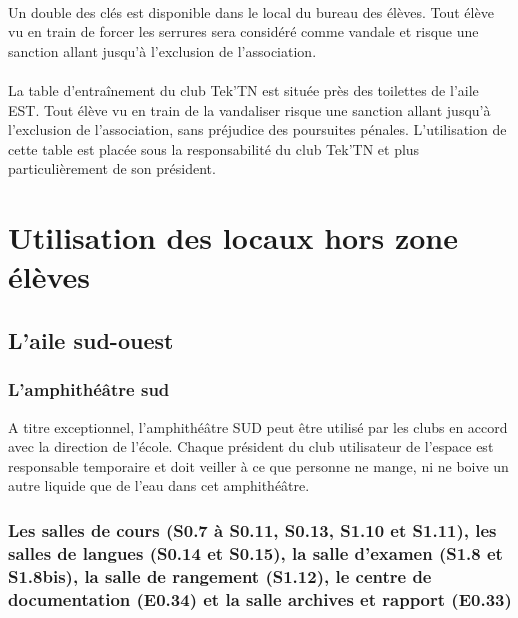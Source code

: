 \documentclass{article} %
\begin{document}
                \paragraph{}
				Un double des clés est disponible dans le local du bureau des
				élèves. Tout élève vu en train de forcer les serrures sera
				considéré comme vandale et risque une sanction allant jusqu’à
				l’exclusion de l’association.

                \paragraph{}
				La table d'entraînement du club Tek’TN est située près des
				toilettes de l’aile EST\@. Tout élève vu en train de la
				vandaliser risque une sanction allant jusqu’à l’exclusion de
				l’association, sans préjudice des poursuites pénales.
				L’utilisation de cette table est placée sous la responsabilité
				du club Tek’TN et plus particulièrement de son président.

	\section{Utilisation des locaux hors zone élèves}
\label{sec:utilisation_des_locaux_hors_zone_eleves}

		\subsection{L'aile sud-ouest}
\label{sub:l_aile_sud_ouest}

			\subsubsection{L'amphithéâtre sud}
\label{ssub:l_amphitheatre_sud}

				A titre exceptionnel, l’amphithéâtre SUD peut être utilisé par
				les clubs en accord avec la direction de l'école. Chaque président 
				du club utilisateur de l’espace est responsable temporaire et doit
				veiller à ce que personne ne mange, ni ne boive un autre
				liquide que de l’eau dans cet amphithéâtre.

			\subsubsection{Les salles de cours (S0.7 à S0.11, S0.13, S1.10 et
			S1.11), les salles de langues (S0.14 et S0.15), la salle d'examen
			(S1.8 et S1.8bis), la salle de rangement (S1.12), le centre de
			documentation (E0.34) et la salle archives et rapport (E0.33)}
\label{ssub:les_salles_de_cours_s0_7_a_s0_11_s0_13_s1_10_et_s1_11_les_salles_de_langues_s0_14_et_s0_15_la_salle_d_examen_s1_8_et_s1_8bis_la_salle_de_rangement_s1_12_le_centre_de_documentation_e0_34_et_la_salle_archives_et_rapport_e0_33}
\end{document}
